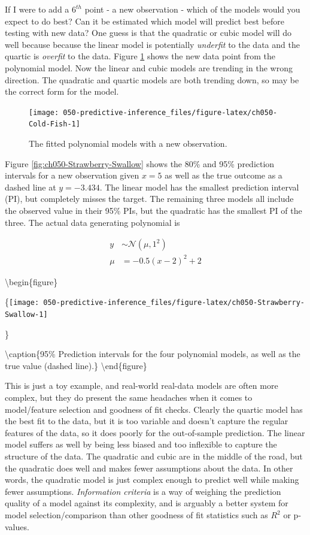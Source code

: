 \documentclass[11pt, oneside, openany]{scrbook}
\begin{document}
If I were to add a \(6^{th}\) point - a new observation - which of the models would you expect to do best? Can it be estimated which model will predict best before testing with new data? One guess is that the quadratic or cubic model will do well because because the linear model is potentially \emph{underfit} to the data and the quartic is \emph{overfit} to the data. Figure \ref{fig:ch050-Cold-Fish} shows the new data point from the polynomial model. Now the linear and cubic models are trending in the wrong direction. The quadratic and quartic models are both trending down, so may be the correct form for the model.

\begin{figure}

{\centering \texttt{[image: 050-predictive-inference\_files/figure-latex/ch050-Cold-Fish-1]} 

}

\caption{The fitted polynomial models with a new observation.}\label{fig:ch050-Cold-Fish}
\end{figure}

Figure \ref{fig:ch050-Strawberry-Swallow} shows the 80\% and 95\% prediction intervals for a new observation given \(x = 5\) as well as the true outcome as a dashed line at \(y = -3.434\). The linear model has the smallest prediction interval (PI), but completely misses the target. The remaining three models all include the observed value in their 95\% PIs, but the quadratic has the smallest PI of the three. The actual data generating polynomial is

\begin{align*}
y &\sim \mathcal{N}(\mu, 1^2) \\
\mu &= -0.5(x - 2)^2 + 2
\end{align*}

\textbackslash begin\{figure\}

\{\centering \texttt{[image: 050-predictive-inference\_files/figure-latex/ch050-Strawberry-Swallow-1]}

\}

\textbackslash caption\{95\% Prediction intervals for the four polynomial models, as well as the true value (dashed line).\}\label{fig:ch050-Strawberry-Swallow}
\textbackslash end\{figure\}

This is just a toy example, and real-world real-data models are often more complex, but they do present the same headaches when it comes to model/feature selection and goodness of fit checks. Clearly the quartic model has the best fit to the data, but it is too variable and doesn't capture the regular features of the data, so it does poorly for the out-of-sample prediction. The linear model suffers as well by being less biased and too inflexible to capture the structure of the data. The quadratic and cubic are in the middle of the road, but the quadratic does well and makes fewer assumptions about the data. In other words, the quadratic model is just complex enough to predict well while making fewer assumptions. \emph{Information criteria} is a way of weighing the prediction quality of a model against its complexity, and is arguably a better system for model selection/comparison than other goodness of fit statistics such as \(R^2\) or p-values.
\end{document}
